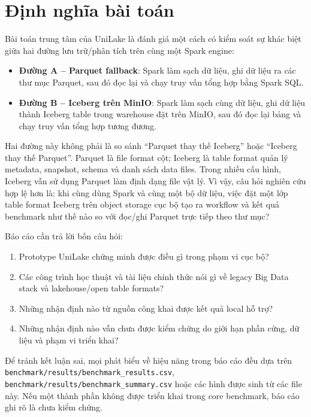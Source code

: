 \section{Định nghĩa bài toán}

Bài toán trung tâm của UniLake là đánh giá một cách có kiểm soát sự khác biệt giữa hai đường lưu trữ/phân tích trên cùng một Spark engine:

\begin{itemize}
\item \textbf{Đường A -- Parquet fallback}: Spark làm sạch dữ liệu, ghi dữ liệu ra các thư mục Parquet, sau đó đọc lại và chạy truy vấn tổng hợp bằng Spark SQL.
\item \textbf{Đường B -- Iceberg trên MinIO}: Spark làm sạch cùng dữ liệu, ghi dữ liệu thành Iceberg table trong warehouse đặt trên MinIO, sau đó đọc lại bảng và chạy truy vấn tổng hợp tương đương.
\end{itemize}

Hai đường này không phải là so sánh ``Parquet thay thế Iceberg'' hoặc ``Iceberg thay thế Parquet''. Parquet là file format cột; Iceberg là table format quản lý metadata, snapshot, schema và danh sách data files. Trong nhiều cấu hình, Iceberg vẫn sử dụng Parquet làm định dạng file vật lý. Vì vậy, câu hỏi nghiên cứu hợp lệ hơn là: khi cùng dùng Spark và cùng một bộ dữ liệu, việc đặt một lớp table format Iceberg trên object storage cục bộ tạo ra workflow và kết quả benchmark như thế nào so với đọc/ghi Parquet trực tiếp theo thư mục?

Báo cáo cần trả lời bốn câu hỏi:

\begin{enumerate}
\item Prototype UniLake chứng minh được điều gì trong phạm vi cục bộ?
\item Các công trình học thuật và tài liệu chính thức nói gì về legacy Big Data stack và lakehouse/open table formats?
\item Những nhận định nào từ nguồn công khai được kết quả local hỗ trợ?
\item Những nhận định nào vẫn chưa được kiểm chứng do giới hạn phần cứng, dữ liệu và phạm vi triển khai?
\end{enumerate}

Để tránh kết luận sai, mọi phát biểu về hiệu năng trong báo cáo đều dựa trên \texttt{benchmark/results/benchmark\_results.csv}, \texttt{benchmark/results/benchmark\_summary.csv} hoặc các hình được sinh từ các file này. Nếu một thành phần không được triển khai trong core benchmark, báo cáo ghi rõ là chưa kiểm chứng.
